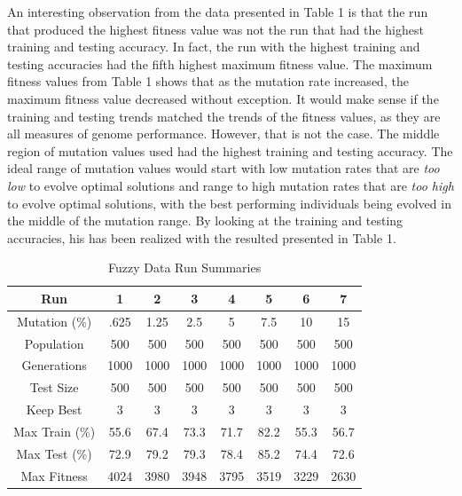 \documentclass[10pt,conference]{IEEEtran}
\begin{document}
An interesting observation from the data presented in Table 1 is that the run that produced the highest fitness value was not the run that had the highest training and testing accuracy.  In fact, the run with the highest training and testing accuracies had the fifth highest maximum fitness value.  The maximum fitness values from Table 1 shows that as the mutation rate increased, the maximum fitness value decreased without exception.  It would make sense if the training and testing trends matched the trends of the fitness values, as they are all measures of genome performance.  However, that is not the case.  The middle region of mutation values used had the highest training and testing accuracy.  The ideal range of mutation values would start with low mutation rates that are \textit{too low} to evolve optimal solutions and range to high mutation rates that are \textit{too high} to evolve optimal solutions, with the best performing individuals being evolved in the middle of the mutation range.  By looking at the training and testing accuracies, his has been realized with the resulted presented in Table 1.  

\begin{table}[H]
\begin{tabular}{|c|c|c|c|c|c|c|c|}
\hline
Run            & 1    & 2    & 3    & 4    & 5    & 6    & 7    \\ \hline
Mutation (\%)  & .625 & 1.25 & 2.5  & 5    & 7.5  & 10   & 15   \\ \hline
Population     & 500  & 500  & 500  & 500  & 500  & 500  & 500  \\ \hline
Generations    & 1000 & 1000 & 1000 & 1000 & 1000 & 1000 & 1000 \\ \hline
Test Size      & 500  & 500  & 500  & 500  & 500  & 500  & 500  \\ \hline
Keep Best      & 3    & 3    & 3    & 3    & 3    & 3    & 3    \\ \hline
Max Train (\%) & 55.6 & 67.4 & 73.3 & 71.7 & 82.2 & 55.3 & 56.7 \\ \hline
Max Test (\%)  & 72.9 & 79.2 & 79.3 & 78.4 & 85.2 & 74.4 & 72.6 \\ \hline
Max Fitness    & 4024 & 3980 & 3948 & 3795 & 3519 & 3229 & 2630 \\ \hline
\end{tabular}
\\
\caption{Fuzzy Data Run Summaries}
\end{table}
\end{document}
